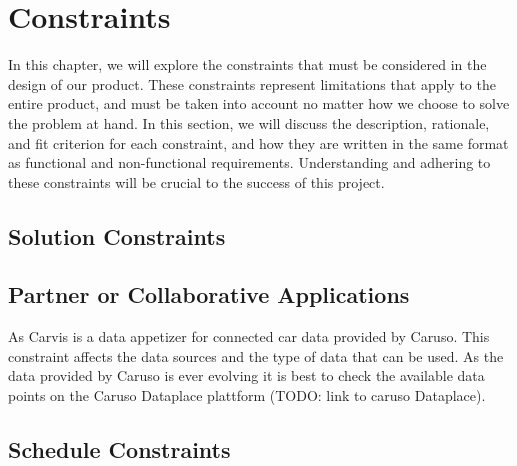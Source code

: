 \chapter{Constraints}

In this chapter, we will explore the constraints that must be considered in the design of our product. These constraints represent limitations that apply to the entire product, and must be taken into account no matter how we choose to solve the problem at hand. In this section, we will discuss the description, rationale, and fit criterion for each constraint, and how they are written in the same format as functional and non-functional requirements. Understanding and adhering to these constraints will be crucial to the success of this project.

\section{Solution Constraints}


\section{Partner or Collaborative Applications}

As Carvis is a data appetizer for connected car data provided by Caruso. This constraint affects the data sources and the type of data that can be used. As the data provided by Caruso is ever evolving it is best to check the available data points on the Caruso Dataplace plattform (TODO: link to caruso Dataplace).



\section{Schedule Constraints}

